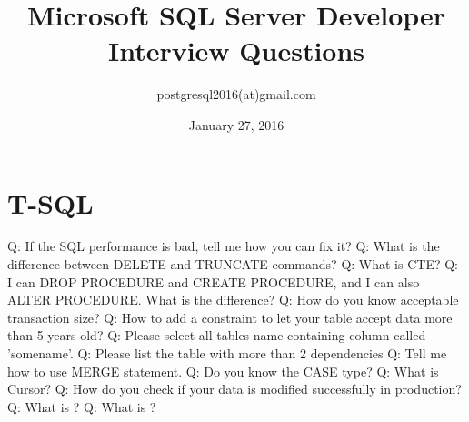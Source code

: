 \documentclass[a4paper,11pt]{article}
\begin{document}
\title{Microsoft SQL Server Developer Interview Questions}
\author{postgresql2016(at)gmail.com}
\date{January 27, 2016}
\maketitle
\section{T-SQL}
Q: If the SQL performance is bad, tell me how you can fix it? \newline \newline
\noindent 
Q: What is the difference between DELETE and TRUNCATE commands? \newline \newline
\noindent 
Q: What is CTE? \newline \newline
\noindent 
Q: I can DROP PROCEDURE and CREATE PROCEDURE, and I can also ALTER PROCEDURE. What is the difference? \newline \newline
\noindent 
Q: How do you know acceptable transaction size? \newline \newline
\noindent 
Q: How to add a constraint to let your table accept data more than 5 years old? \newline \newline
\noindent 
Q: Please select all tables name containing column called 'somename'. \newline \newline
\noindent 
Q: Please list the table with more than 2 dependencies \newline \newline
\noindent 
Q: Tell me how to use MERGE statement. \newline \newline
\noindent 
Q: Do you know the CASE type? \newline \newline
\noindent 
Q: What is Cursor? \newline \newline
\noindent 
Q: How do you check if your data is modified successfully in production? \newline \newline
\noindent 
Q: What is ? \newline \newline
\noindent 
Q: What is ? \newline \newline
\end{document}
